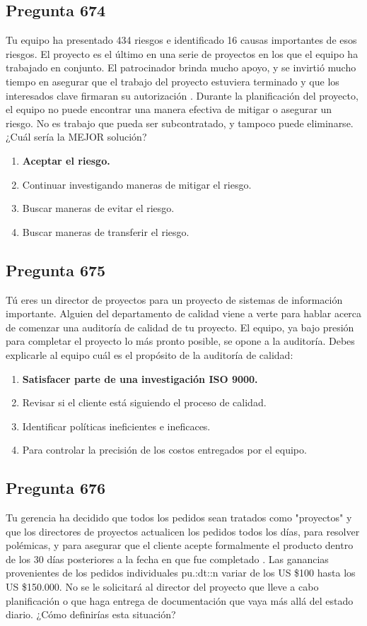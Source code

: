 \documentclass[11pt,a4paper]{article}
\begin{document}
\subsection*{Pregunta 674}
Tu equipo ha presentado 434 riesgos e identificado 16 causas importantes de esos riesgos. El proyecto es el último en una serie de proyectos en los que el equipo ha trabajado en conjunto. El patrocinador brinda mucho apoyo, y se invirtió mucho tiempo en asegurar que el trabajo del proyecto estuviera terminado y que los interesados clave firmaran su autorización . Durante la planificación del proyecto, el equipo no puede encontrar una manera efectiva de mitigar o asegurar un riesgo. No es trabajo que pueda ser subcontratado, y tampoco puede eliminarse. ¿Cuál sería la MEJOR solución?

\begin{enumerate}[label=\alph*)]
  \item \textbf{Aceptar el riesgo.}
  \item Continuar investigando maneras de mitigar el riesgo.
  \item Buscar maneras de evitar el riesgo.
  \item Buscar maneras de transferir el riesgo.
\end{enumerate}

\subsection*{Pregunta 675}
Tú eres un director de proyectos para un proyecto de sistemas de información importante. Alguien del departamento de calidad viene a verte para hablar acerca de comenzar una auditoría de calidad de tu proyecto. El equipo, ya bajo presión para completar el proyecto lo más pronto posible, se opone a la auditoría. Debes explicarle al equipo cuál es el propósito de la auditoría de calidad:

\begin{enumerate}[label=\alph*)]
  \item \textbf{Satisfacer parte de una investigación ISO 9000.}
  \item Revisar si el cliente está siguiendo el proceso de calidad.
  \item Identificar políticas ineficientes e ineficaces.
  \item Para controlar la precisión de los costos entregados por el equipo.
\end{enumerate}

\subsection*{Pregunta 676}
Tu gerencia ha decidido que todos los pedidos sean tratados como "proyectos" y que los directores de proyectos actualicen los pedidos todos los días, para resolver polémicas, y para asegurar que el cliente acepte formalmente el producto dentro de los 30 días posteriores a la fecha en que fue completado . Las ganancias provenientes de los pedidos individuales pu.:dt::n variar de los US \$100 hasta los US \$150.000. No se le solicitará al director del proyecto que lleve a cabo planificación o que haga entrega de documentación que vaya más allá del estado diario. ¿Cómo definirías esta situación?
\end{document}
